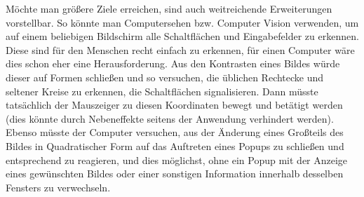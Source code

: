 Möchte man größere Ziele erreichen, sind auch weitreichende
Erweiterungen vorstellbar. So könnte man Computersehen bzw.
Computer Vision verwenden, um auf einem beliebigen Bildschirm
alle Schaltflächen und Eingabefelder zu erkennen. Diese sind
für den Menschen recht einfach zu erkennen, für einen
Computer wäre dies schon eher eine Herausforderung. Aus den
Kontrasten eines Bildes würde dieser auf Formen schließen
und so versuchen, die üblichen Rechtecke und seltener Kreise
zu erkennen, die Schaltflächen signalisieren. Dann müsste
tatsächlich der Mauszeiger zu diesen Koordinaten bewegt
und betätigt werden (dies könnte durch Nebeneffekte seitens
der Anwendung verhindert werden). Ebenso müsste der Computer
versuchen, aus der Änderung eines Großteils des Bildes
in Quadratischer Form auf das Auftreten eines Popups zu 
schließen und entsprechend zu reagieren, und dies möglichst,
ohne ein Popup mit der Anzeige eines gewünschten Bildes
oder einer sonstigen Information innerhalb desselben
Fensters zu verwechseln.
